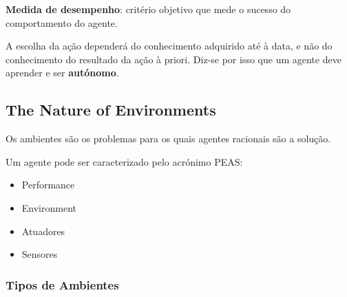 \documentclass[11pt]{article}
\begin{document}
\textbf{Medida de desempenho}: critério objetivo que mede o sucesso do comportamento do agente.\vspace{10pt}

A escolha da ação dependerá do conhecimento adquirido até à data, e não do conhecimento do resultado da ação à priori. Diz-se por isso que um agente deve aprender e ser \textbf{autónomo}.

\subsection{The Nature of Environments}

Os ambientes são os problemas para os quais agentes racionais são a solução.

Um agente pode ser caracterizado pelo acrónimo PEAS:
\begin{itemize}[topsep=4pt, itemsep=0pt]
    \item Performance
    \item Environment
    \item Atuadores
    \item Sensores
\end{itemize}

\subsubsection{Tipos de Ambientes}
\end{document}
